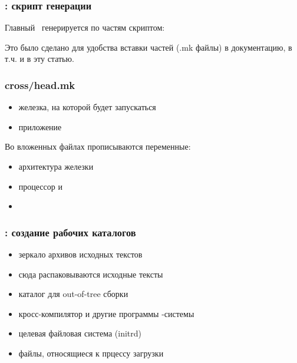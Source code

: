 {\subsubsection{: скрипт генерации }

Главный \ генерируется по частям скриптом:



Это было сделано для удобства вставки частей (.mk файлы) в документацию, в т.ч.
и в эту статью.

\subsubsection{cross/head.mk}

\begin{itemize}
  \item{} железка, на которой будет запускаться
  \item{} приложение 
\end{itemize}

Во вложенных файлах прописываются переменные:

\begin{itemize}
  \item{} архитектура железки
  \item{} процессор и 
  \item{}  
\end{itemize}









\subsubsection{: создание рабочих каталогов}

\begin{itemize}
  \item[\file{GZ}] зеркало архивов исходных текстов
  \item[\file{SRC}] сюда распаковываются исходные тексты
  \item[\file{TMP}] каталог для out-of-tree сборки 
  \item[\file{BUILD}] кросс-компилятор и другие программы -системы
  \item[\file{ROOT}] целевая файловая система  (initrd)
  \item[\file{BOOT}] файлы, относящиеся к прцессу загрузки
\end{itemize}

}

